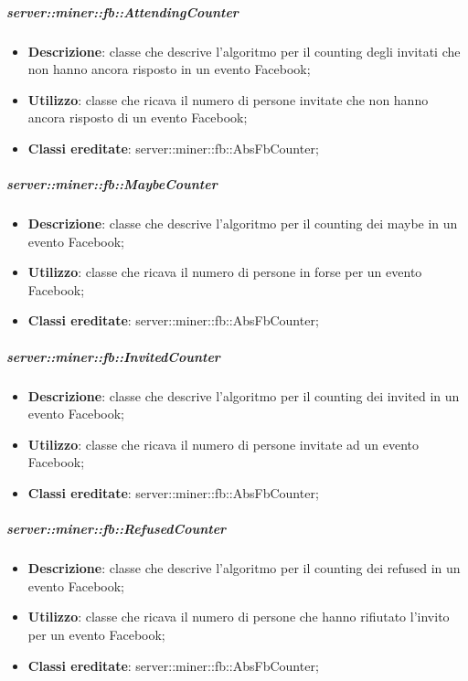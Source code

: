 		\subparagraph{server::miner::fb::AttendingCounter} %
		\label{subp:server_miner_fb_AttendingCounter}
			\begin{itemize}
				\item \textbf{Descrizione}: classe che descrive l'algoritmo per il counting degli invitati che non hanno ancora risposto in un evento Facebook;
				\item \textbf{Utilizzo}: classe che ricava il numero di persone invitate che non hanno ancora risposto di un evento Facebook;
				\item \textbf{Classi ereditate}: server::miner::fb::AbsFbCounter;
			\end{itemize}
	
		\subparagraph{server::miner::fb::MaybeCounter} %
		\label{subp:server_miner_fb_MaybeCounter}
			\begin{itemize}
				\item \textbf{Descrizione}: classe che descrive l'algoritmo per il counting dei maybe in un evento Facebook;
				\item \textbf{Utilizzo}: classe che ricava il numero di persone in forse per un evento Facebook;
				\item \textbf{Classi ereditate}: server::miner::fb::AbsFbCounter;
			\end{itemize}
	
	\subparagraph{server::miner::fb::InvitedCounter} %
		\label{subp:server_miner_fb_InvitedCunter}
			\begin{itemize}
				\item \textbf{Descrizione}: classe che descrive l'algoritmo per il counting dei invited in un evento Facebook;
				\item \textbf{Utilizzo}: classe che ricava il numero di persone invitate ad un evento Facebook;
				\item \textbf{Classi ereditate}: server::miner::fb::AbsFbCounter;
			\end{itemize}

	\subparagraph{server::miner::fb::RefusedCounter} %
		\label{subp:server_miner_fb_RefusedCounter}
			\begin{itemize}
				\item \textbf{Descrizione}: classe che descrive l'algoritmo per il counting dei refused in un evento Facebook;
				\item \textbf{Utilizzo}: classe che ricava il numero di persone che hanno rifiutato l'invito per un evento Facebook;
				\item \textbf{Classi ereditate}: server::miner::fb::AbsFbCounter;
			\end{itemize}
	
